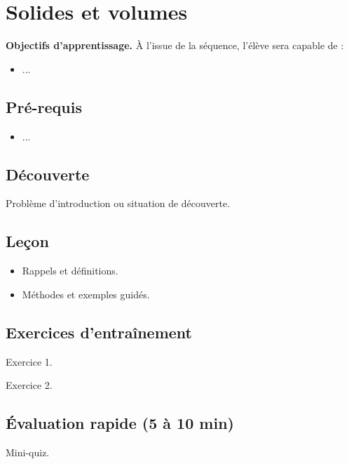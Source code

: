 \chapter{Solides et volumes}
\label{chap:seq20}

\begin{definitionbox}
\textbf{Objectifs d'apprentissage.} À l'issue de la séquence, l'élève sera capable de :
\begin{itemize}
  \item ...
\end{itemize}
\end{definitionbox}

\section*{Pré-requis}
\begin{itemize}
  \item ...
\end{itemize}

\section{Découverte}
\begin{examplebox}
Problème d'introduction ou situation de découverte.
\end{examplebox}

\section{Leçon}
\begin{itemize}
  \item Rappels et définitions.
  \item Méthodes et exemples guidés.
\end{itemize}

\section{Exercices d'entraînement}
\begin{exercisebox}
Exercice 1.
\end{exercisebox}

\begin{exercisebox}
Exercice 2.
\end{exercisebox}

\section{Évaluation rapide (5 à 10 min)}
\begin{exercisebox}
Mini-quiz.
\end{exercisebox}
